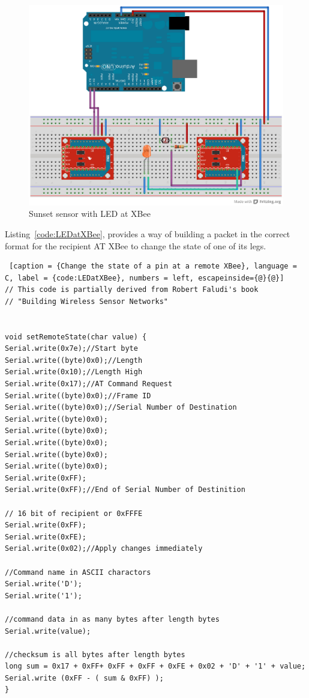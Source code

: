 \begin{figure}[htbp]
  \centering
  \includegraphics[width=0.9\linewidth]{figures/sunset_detector_at_XBee.eps}
  \caption{Sunset sensor with LED at XBee}
  \label{fig:sunset_sensor_at_XBee}
\end{figure}

Listing~\ref{code:LEDatXBee}, provides a way of building a packet in the correct format for the recipient AT XBee to change the state of one of its legs.

\begin{lstlisting} [caption = {Change the state of a pin at a remote XBee}, language = C, label = {code:LEDatXBee}, numbers = left, escapeinside={@}{@}]
// This code is partially derived from Robert Faludi's book
// "Building Wireless Sensor Networks"


void setRemoteState(char value) {
Serial.write(0x7e);//Start byte
Serial.write((byte)0x0);//Length
Serial.write(0x10);//Length High
Serial.write(0x17);//AT Command Request
Serial.write((byte)0x0);//Frame ID
Serial.write((byte)0x0);//Serial Number of Destination
Serial.write((byte)0x0);
Serial.write((byte)0x0);
Serial.write((byte)0x0);
Serial.write((byte)0x0);
Serial.write((byte)0x0);
Serial.write(0xFF);
Serial.write(0xFF);//End of Serial Number of Destinition

// 16 bit of recipient or 0xFFFE
Serial.write(0xFF);
Serial.write(0xFE);
Serial.write(0x02);//Apply changes immediately

//Command name in ASCII charactors
Serial.write('D');
Serial.write('1');

//command data in as many bytes after length bytes
Serial.write(value);

//checksum is all bytes after length bytes
long sum = 0x17 + 0xFF+ 0xFF + 0xFF + 0xFE + 0x02 + 'D' + '1' + value;
Serial.write (0xFF - ( sum & 0xFF) );
}

\end{lstlisting}
